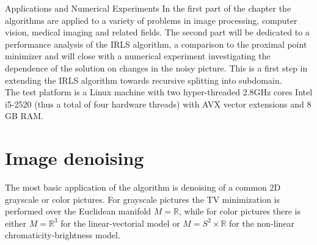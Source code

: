 \begin{chapter}{Applications and Numerical Experiments}
\label{ch:numericalexperiments}
In the first part of the chapter the algorithms are applied to a variety of problems in image processing, computer vision, medical imaging and related fields.
The second part will be dedicated to a performance analysis of the IRLS algorithm, a comparison to the proximal point minimizer and will close with a numerical experiment investigating the 
dependence of the solution on changes in the noisy picture. This is a first step in extending the IRLS algorithm towards recursive splitting into subdomain.\\

The test platform is a Linux machine with two hyper-threaded 2.8GHz cores Intel i5-2520 (thus a total of four hardware threads)
with AVX vector extensions and 8 GB RAM. 


\section{Image denoising} %
\label{sec:image denoising}
The most basic application of the algorithm is denoising of a common 2D grayscale or color pictures.
For grayscale pictures the TV minimization is performed over the Euclidean manifold $M=\mathbb{R}$, while for color
pictures there is either $M=\mathbb{R}^3$ for the linear-vectorial model or
$M=S^2\times\mathbb{R}$ for the non-linear chromaticity-brightness model.


\end{chapter}
